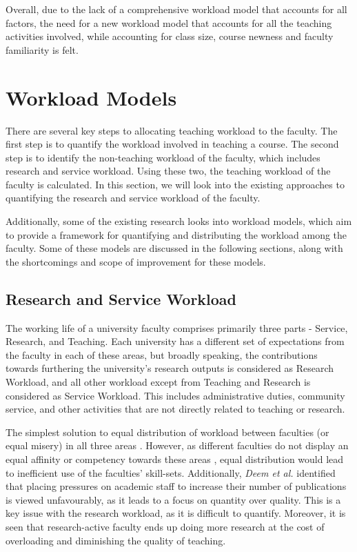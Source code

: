 Overall, due to the lack of a comprehensive workload model that accounts for all factors, the need for a new workload model that accounts for all the teaching activities involved, while accounting for class size, course newness and faculty familiarity is felt.

\section{Workload Models}

There are several key steps to allocating teaching workload to the faculty. The first step is to quantify the workload involved in teaching a course. The second step is to identify the non-teaching workload of the faculty, which includes research and service workload. Using these two, the teaching workload of the faculty is calculated. In this section, we will look into the existing approaches to quantifying the research and service workload of the faculty.

Additionally, some of the existing research looks into workload models, which aim to provide a framework for quantifying and distributing the workload among the faculty. Some of these models are discussed in the following sections, along with the shortcomings and scope of improvement for these models.

\subsection{Research and Service Workload}

The working life of a university faculty comprises primarily three parts - Service, Research, and Teaching. Each university has a different set of expectations from the faculty in each of these areas, but broadly speaking, the contributions towards furthering the university's research outputs is considered as Research Workload, and all other workload except from Teaching and Research is considered as Service Workload. This includes administrative duties, community service, and other activities that are not directly related to teaching or research.

The simplest solution to equal distribution of workload between faculties (or equal misery) in all three areas \cite{gray1989university}. However, as different faculties do not display an equal affinity or competency towards these areas \cite{finlay1994management}, equal distribution would lead to inefficient use of the faculties' skill-sets. Additionally, \textit{Deem et al.} \cite{deem2020new} identified that placing pressures on academic staff to increase their number of publications is viewed unfavourably, as it leads to a focus on quantity over quality. This is a key issue with the research workload, as it is difficult to quantify. Moreover, it is seen that research-active faculty ends up doing more research at the cost of overloading and diminishing the quality of teaching.

